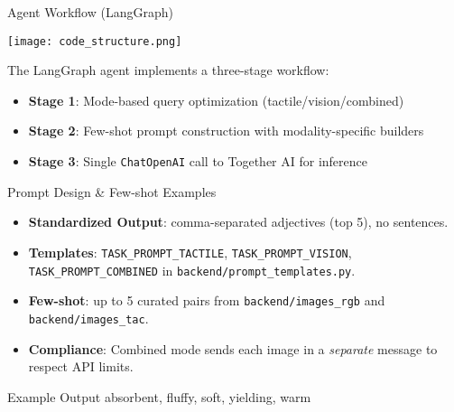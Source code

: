 \documentclass[aspectratio=169,xcolor=dvipsnames]{beamer}
\begin{document}

    \begin{frame}{Agent Workflow (LangGraph)}
        \begin{center}
            \texttt{[image: code\_structure.png]}
        \end{center}
        \vspace{0.3cm}
        \small 
        The LangGraph agent implements a three-stage workflow:
        \begin{itemize}
            \item \textbf{Stage 1}: Mode-based query optimization (tactile/vision/combined)
            \item \textbf{Stage 2}: Few-shot prompt construction with modality-specific builders
            \item \textbf{Stage 3}: Single \texttt{ChatOpenAI} call to Together AI for inference
        \end{itemize}
    \end{frame}

    \begin{frame}{Prompt Design \& Few-shot Examples}
        \begin{itemize}
            \item \textbf{Standardized Output}: comma-separated adjectives (top 5), no sentences.
            \item \textbf{Templates}: \texttt{TASK\_PROMPT\_TACTILE}, \texttt{TASK\_PROMPT\_VISION}, \texttt{TASK\_PROMPT\_COMBINED} in \texttt{backend/prompt\_templates.py}.
            \item \textbf{Few-shot}: up to 5 curated pairs from \texttt{backend/images\_rgb} and \texttt{backend/images\_tac}.
            \item \textbf{Compliance}: Combined mode sends each image in a \textit{separate} message to respect API limits.
        \end{itemize}
        \vspace{0.3cm}
        \begin{block}{Example Output}
            \small absorbent, fluffy, soft, yielding, warm
        \end{block}
    \end{frame}
\end{document}

